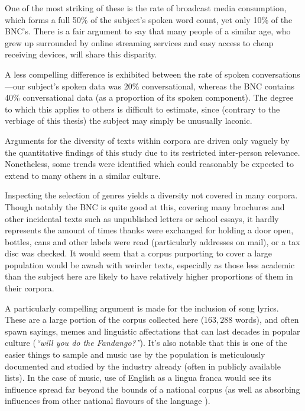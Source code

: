 One of the most striking of these is the rate of broadcast media consumption, which forms a full 50\% of the subject's spoken word count, yet only 10\% of the BNC's.  There is a fair argument to say that many people of a similar age, who grew up surrounded by online streaming services and easy access to cheap receiving devices, will share this disparity.

A less compelling difference is exhibited between the rate of spoken conversations---our subject's spoken data was 20\% conversational, whereas the BNC contains 40\% conversational data (as a proportion of its spoken component).  The degree to which this applies to others is difficult to estimate, since (contrary to the verbiage of this thesis) the subject may simply be unusually laconic.



Arguments for the diversity of texts within corpora are driven only vaguely by the quantitative findings of this study due to its restricted inter-person relevance.  Nonetheless, some trends were identified which could reasonably be expected to extend to many others in a similar culture.

Inspecting the selection of genres yields a diversity not covered in many corpora.  Though notably the BNC is quite good at this, covering many brochures and other incidental texts such as unpublished letters or school essays, it hardly represents the amount of times thanks were exchanged for holding a door open, bottles, cans and other labels were read (particularly addresses on mail), or a tax disc was checked.  It would seem that a corpus purporting to cover a large population would be awash with weirder texts, especially as those less academic than the subject here are likely to have relatively higher proportions of them in their corpora.

A particularly compelling argument is made for the inclusion of song lyrics.  These are a large portion of the corpus collected here  ($163,288$ words), and often spawn sayings, memes and linguistic affectations that can last decades in popular culture (\textit{``will you do the Fandango?''}).  It's also notable that this is one of the easier things to sample and music use by the population is meticulously documented and studied by the industry already (often in publicly available lists).  In the case of music, use of English as a lingua franca would see its influence spread far beyond the bounds of a national corpus (as well as absorbing influences from other national flavours of the language%
).









